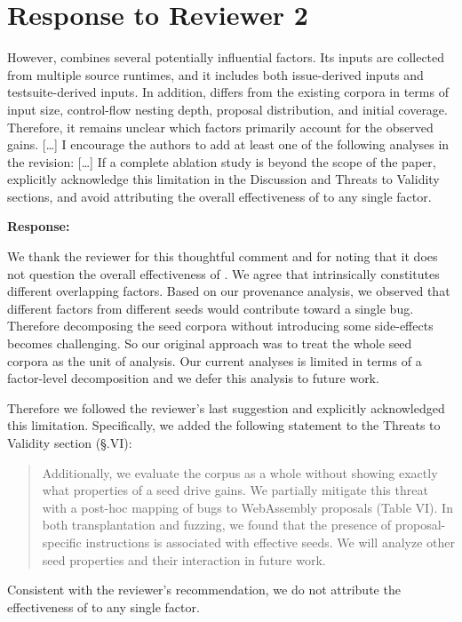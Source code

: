 \documentclass[11pt]{article}
\newenvironment{response}{%
    \par\vspace{10pt}
    \par\noindent\textbf{\color{tseblue}Response:}\par\nobreak\ignorespaces
}{%
    \par\vspace{15pt}
}
\newcounter{reviewernum}
\newcounter{cmtcounter}[reviewernum]
\newcommand{\newreviewer}{\stepcounter{reviewernum}\setcounter{cmtcounter}{0}}
\newenvironment{rcomment}{%
    \stepcounter{cmtcounter}%
    \begin{revcomment}[R\thereviewernum{}.C\thecmtcounter{}.~Reviewer~\thereviewernum{}, Comment~\thecmtcounter]
}{%
    \end{revcomment}
}
\begin{document}
\section{Response to Reviewer 2}
\newreviewer

\begin{rcomment}
    However, \rtbench{} combines several potentially influential factors. Its inputs are collected from multiple source runtimes, and it includes both issue-derived inputs and testsuite-derived inputs. In addition, \rtbench{} differs from the existing corpora in terms of input size, control-flow nesting depth, proposal distribution, and initial coverage. Therefore, it remains unclear which factors primarily account for the observed gains. [\ldots] I encourage the authors to add at least one of the following analyses in the revision: [\ldots] If a complete ablation study is beyond the scope of the paper, explicitly acknowledge this limitation in the Discussion and Threats to Validity sections, and avoid attributing the overall effectiveness of \rtbench{} to any single factor.
\end{rcomment}
\begin{response}
    We thank the reviewer for this thoughtful comment and for noting that it does not question the overall effectiveness of \rtbench{}. We agree that \rtbench{} intrinsically constitutes different overlapping factors. Based on our provenance analysis, we observed that different factors from different seeds would contribute toward a single bug. Therefore decomposing the seed corpora without introducing some side-effects becomes challenging. So our original approach was to treat the whole seed corpora as the unit of analysis. Our current analyses is limited in terms of a factor-level decomposition and we defer this analysis to future work.
    
    Therefore we followed the reviewer's last suggestion and explicitly acknowledged this limitation. Specifically, we added the following statement to the Threats to Validity section (\S.VI):

    \begin{quote}
    Additionally, we evaluate the corpus as a whole without showing exactly what properties of a seed drive gains. We partially mitigate this threat with a post-hoc mapping of bugs to WebAssembly proposals (Table VI). In both transplantation and fuzzing, we found that the presence of proposal-specific instructions is associated with effective seeds. We will analyze other seed properties and their interaction in future work.
    \end{quote}

    Consistent with the reviewer's recommendation, we do not attribute the effectiveness of \rtbench{} to any single factor.
\end{response}
\end{document}
